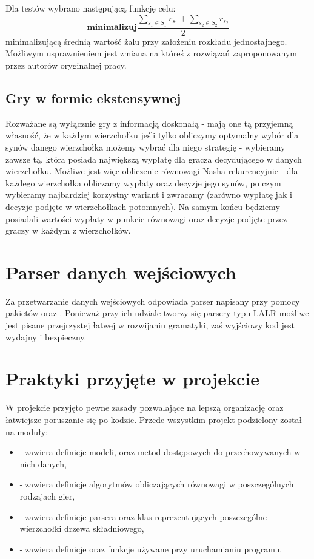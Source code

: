 \documentclass[polish]{standalone}
\begin{document}
Dla testów wybrano następującą funkcję celu:
$$\textbf{minimalizuj} \frac{\sum_{s_1 \in S_1} r_{s_1} + \sum_{s_2 \in S_2} r_{s_2}}{2}$$
minimalizującą średnią wartość żalu przy założeniu rozkładu jednostajnego. Możliwym usprawnieniem jest zmiana na któreś
z rozwiązań zaproponowanym przez autorów oryginalnej pracy.

\subsection{Gry w formie ekstensywnej}

Rozważane są wyłącznie gry z informacją doskonałą - mają one tą przyjemną własność, że w każdym wierzchołku jeśli
tylko obliczymy optymalny wybór dla synów danego wierzchołka możemy wybrać dla niego strategię - wybieramy zawsze tą,
która posiada największą wypłatę dla gracza decydującego w danych wierzchołku. Możliwe jest więc obliczenie równowagi
Nasha rekurencyjnie - dla każdego wierzchołka obliczamy wypłaty oraz decyzje jego synów, po czym wybieramy najbardziej
korzystny wariant i zwracamy (zarówno wypłatę jak i decyzje podjęte w wierzchołkach potomnych). Na samym końcu będziemy
posiadali wartości wypłaty w punkcie równowagi oraz decyzje podjęte przez graczy w każdym z wierzchołków.

\section{Parser danych wejściowych}

Za przetwarzanie danych wejściowych odpowiada parser napisany przy pomocy pakietów  oraz . Ponieważ
przy ich udziale tworzy się parsery typu LALR możliwe jest pisane przejrzystej łatwej w rozwijaniu gramatyki, zaś 
wyjściowy kod jest wydajny i bezpieczny.

\section{Praktyki przyjęte w projekcie}

W projekcie przyjęto pewne zasady pozwalające na lepszą organizację oraz łatwiejsze poruszanie się po kodzie. Przede
wszystkim projekt podzielony został na moduły:
\begin{itemize}
\item {} - zawiera definicje modeli, oraz metod dostępowych do przechowywanych w nich danych,
\item {} - zawiera definicje algorytmów obliczających równowagi w poszczególnych rodzajach gier,
\item {} - zawiera definicje parsera oraz klas reprezentujących poszczególne wierzchołki drzewa składniowego,
\item {} - zawiera definicje oraz funkcje używane przy uruchamianiu programu.
\end{itemize}
\end{document}
